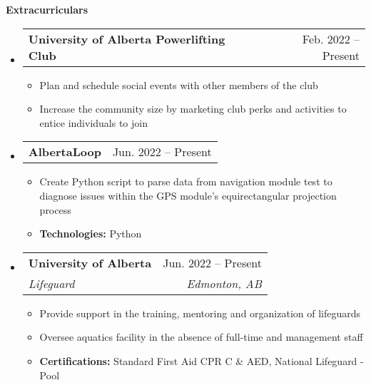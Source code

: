 \documentclass[letterpaper,12pt]{article}[leftmargin=*]
\makeatletter
\def \entryspacing {-0pt}
\renewcommand{\section}[2]{\vspace{5pt}
  \colorbox{secondary}{\color{white}\raggedbottom\normalsize\textbf{{#1}{\hspace{7pt}#2}}}
}
\newcommand{\resumeEntryStart}{\begin{itemize}[leftmargin=2.5mm]}
\newcommand{\resumeEntryEnd}{\end{itemize}\vspace{\entryspacing}}
\newcommand{\resumeItemListStart}{\begin{itemize}[leftmargin=4.5mm]}
\newcommand{\resumeItemListEnd}{\end{itemize}}
\newcommand{\resumeItem}[1]{
  \item\small{
    {#1 \vspace{-2pt}}
  }
}
\newcommand{\resumeEntryTSDL}[4]{
  \vspace{-1pt}\item[]
    \begin{tabularx}{0.97\textwidth}{X@{\hspace{60pt}}r}
      \textbf{\color{primary}#1} & {\firabook\color{accent}\small#2} \\
      \textit{\color{accent}\small#3} & \textit{\color{accent}\small#4} \\
    \end{tabularx}\vspace{-6pt}
}
\newcommand{\resumeEntryTD}[2]{
  \vspace{-1pt}\item[]
    \begin{tabularx}{0.97\textwidth}{X@{\hspace{60pt}}r}
      \textbf{\color{primary}#1} & {\firabook\color{accent}\small#2} \\
    \end{tabularx}\vspace{-6pt}
}
\makeatother
\begin{document}
\section{\faGroup}{Extracurriculars}

 \resumeEntryStart
  \resumeEntryTD{University of Alberta Powerlifting Club}{Feb. 2022 -- Present}
    \resumeItemListStart
      \resumeItem{Plan and schedule social events with other members of the club}
      \resumeItem{Increase the community size by marketing club perks and activities to entice individuals to join} 
    \resumeItemListEnd
 \resumeEntryEnd

 \resumeEntryStart
 \resumeEntryTD{AlbertaLoop}{Jun. 2022 -- Present}
 \resumeItemListStart
      \resumeItem {Create Python script to parse data from navigation module test to diagnose issues within the GPS module's equirectangular projection process}
      \resumeItem {\textbf{Technologies:} Python}
    \resumeItemListEnd
 \resumeEntryEnd

 \resumeEntryStart
 \resumeEntryTSDL
 {University of Alberta}{Jun. 2022 -- Present}
 {Lifeguard}{Edmonton, AB}
     \resumeItemListStart
     \resumeItem {Provide support in the training, mentoring and organization of lifeguards}
     \resumeItem {Oversee aquatics facility in the absence of full-time and management staff}
     \resumeItem {\textbf{Certifications:} Standard First Aid CPR C \& AED, National Lifeguard - Pool}
   \resumeItemListEnd
 \resumeEntryEnd


\end{document}
